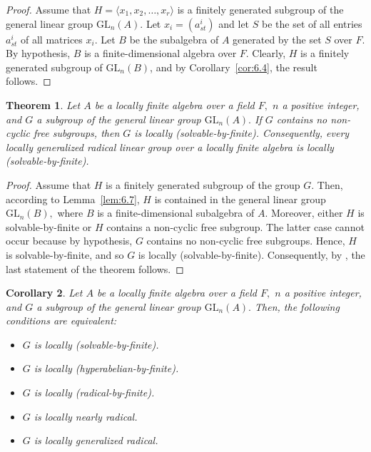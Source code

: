 \documentclass{amsart}
\newtheorem{theorem}{Theorem}[section]
\newtheorem{corollary}[theorem]{Corollary}
\theoremstyle{definition}
\begin{document}
\begin{proof} Assume that $H=\langle x_1,x_2,\ldots, x_r\rangle$ is a finitely generated subgroup of the general linear group $\mathrm{GL}_n(A).$ Let $x_i=(a_{st}^i)$ and let $S$ be the set of all entries $a_{st}^i$ of all matrices $x_i$. Let $B$ be the subalgebra of  $A$ generated by the set $S$ over $F.$ By hypothesis, $B$ is a finite-dimensional algebra over $F$. Clearly, $H$ is a finitely generated subgroup of $\mathrm{GL}_n(B)$, and by Corollary~\ref{cor:6.4}, the result follows.
\end{proof}
\begin{theorem}\label{th:6.8} Let $A$ be a locally finite algebra over a field $F,$ $n$ a positive integer, and $G$ a subgroup of the general linear group $\mathrm{GL}_n(A).$ If $G$ contains no non-cyclic free subgroups, then $G$ is locally (solvable-by-finite). Consequently, every locally generalized radical linear group over a locally finite algebra is locally (solvable-by-finite).
\end{theorem}
\begin{proof} Assume that $H$ is a finitely generated subgroup of the group $G.$ Then, according to Lemma~\ref{lem:6.7}, $H$ is contained in the general linear group $\mathrm{GL}_{n}(B),$ where $B$ is a finite-dimensional subalgebra of $A.$ Moreover, either $H$ is solvable-by-finite or $H$ contains a non-cyclic free subgroup. The latter case cannot occur because by hypothesis, $G$ contains no non-cyclic free subgroups. Hence, $H$ is solvable-by-finite, and so $G$ is locally (solvable-by-finite). Consequently, by \cite[Theorem 2.4]{Pa_ChuaHai_2026}, the last statement of the theorem follows.
\end{proof}
\begin{corollary}\label{cor:6.9} Let $A$ be a locally finite algebra over a field $F,$ $n$ a positive integer, and $G$ a subgroup of the general linear group $\mathrm{GL}_n(A).$ Then, the following conditions are equivalent:
	\begin{itemize}
		\item [(1)] $G$ is locally (solvable-by-finite).
		\item [(2)] $G$ is locally (hyperabelian-by-finite).
		\item [(3)] $G$ is locally (radical-by-finite).
		\item [(4)] $G$ is locally nearly radical.
		\item [(5)] $G$ is locally generalized radical.
	\end{itemize}
\end{corollary}
\end{document}
